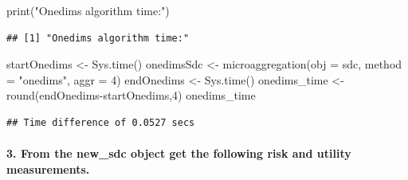 \documentclass[
]{article}
\newenvironment{Shaded}{\begin{snugshade}}{\end{snugshade}}
\newcommand{\AttributeTok}[1]{\textcolor[rgb]{0.77,0.63,0.00}{#1}}
\newcommand{\DecValTok}[1]{\textcolor[rgb]{0.00,0.00,0.81}{#1}}
\newcommand{\FunctionTok}[1]{\textcolor[rgb]{0.00,0.00,0.00}{#1}}
\newcommand{\NormalTok}[1]{#1}
\newcommand{\OtherTok}[1]{\textcolor[rgb]{0.56,0.35,0.01}{#1}}
\newcommand{\SpecialCharTok}[1]{\textcolor[rgb]{0.00,0.00,0.00}{#1}}
\newcommand{\StringTok}[1]{\textcolor[rgb]{0.31,0.60,0.02}{#1}}
\begin{document}
\begin{Shaded}
\begin{Highlighting}[]
\FunctionTok{print}\NormalTok{(}\StringTok{"Onedims algorithm time:"}\NormalTok{)}
\end{Highlighting}
\end{Shaded}

\begin{verbatim}
## [1] "Onedims algorithm time:"
\end{verbatim}

\begin{Shaded}
\begin{Highlighting}[]
\NormalTok{startOnedims }\OtherTok{\textless{}{-}} \FunctionTok{Sys.time}\NormalTok{()}
\NormalTok{onedimsSdc }\OtherTok{\textless{}{-}} \FunctionTok{microaggregation}\NormalTok{(}\AttributeTok{obj =}\NormalTok{ sdc, }\AttributeTok{method =} \StringTok{"onedims"}\NormalTok{, }\AttributeTok{aggr =} \DecValTok{4}\NormalTok{)}
\NormalTok{endOnedims }\OtherTok{\textless{}{-}} \FunctionTok{Sys.time}\NormalTok{()}
\NormalTok{onedims\_time }\OtherTok{\textless{}{-}} \FunctionTok{round}\NormalTok{(endOnedims}\SpecialCharTok{{-}}\NormalTok{startOnedims,}\DecValTok{4}\NormalTok{)}
\NormalTok{onedims\_time}
\end{Highlighting}
\end{Shaded}

\begin{verbatim}
## Time difference of 0.0527 secs
\end{verbatim}

\hypertarget{from-the-new_sdc-object-get-the-following-risk-and-utility-measurements.}{%
\paragraph{3. From the new\_sdc object get the following risk and
utility
measurements.}\label{from-the-new_sdc-object-get-the-following-risk-and-utility-measurements.}}
\end{document}

